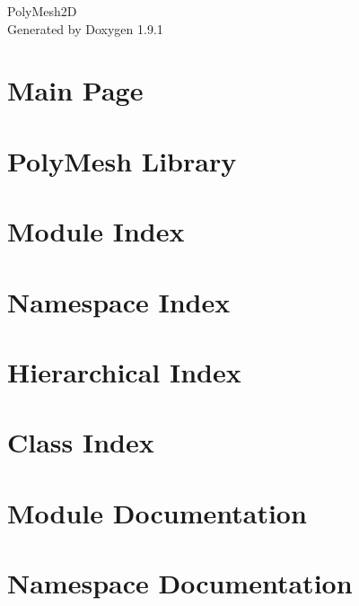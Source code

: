 \let\mypdfximage\pdfximage\def\pdfximage{\immediate\mypdfximage}\documentclass[twoside]{book}
\newcommand{\+}{\discretionary{\mbox{\scriptsize$\hookleftarrow$}}{}{}}
\newcommand{\clearemptydoublepage}{%
  \newpage{\pagestyle{empty}\cleardoublepage}%
}
\begin{document}
\raggedbottom

\hypersetup{pageanchor=false,
             bookmarksnumbered=true,
             pdfencoding=unicode
            }
\begin{titlepage}
\vspace*{7cm}
\begin{center}%
{\Large Poly\+Mesh2D }\\
\vspace*{1cm}
{\large Generated by Doxygen 1.9.1}\\
\end{center}
\end{titlepage}
\clearemptydoublepage
{}
\tableofcontents
\clearemptydoublepage
{}
\hypersetup{pageanchor=true}

\chapter{Main Page}
\label{index}\hypertarget{index}{}
\chapter{Poly\+Mesh Library}
\label{md_README}

\chapter{Module Index}

\chapter{Namespace Index}

\chapter{Hierarchical Index}

\chapter{Class Index}

\chapter{Module Documentation}




\chapter{Namespace Documentation}





\end{document}
